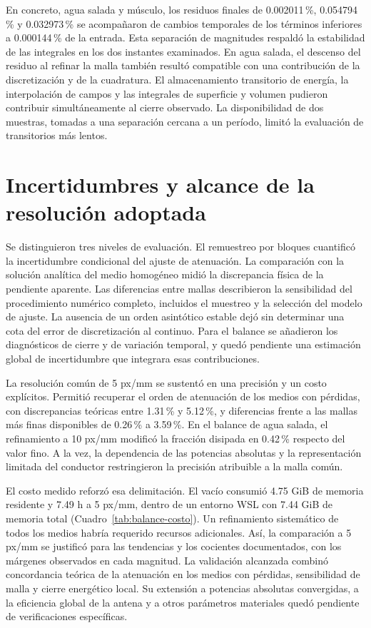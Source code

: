 En concreto, agua salada y músculo, los residuos finales de 0.002011\,\%, 0.054794\,\% y 0.032973\,\% se acompañaron de cambios temporales de los términos inferiores a 0.000144\,\% de la entrada. Esta separación de magnitudes respaldó la estabilidad de las integrales en los dos instantes examinados. En agua salada, el descenso del residuo al refinar la malla también resultó compatible con una contribución de la discretización y de la cuadratura. El almacenamiento transitorio de energía, la interpolación de campos y las integrales de superficie y volumen pudieron contribuir simultáneamente al cierre observado. La disponibilidad de dos muestras, tomadas a una separación cercana a un período, limitó la evaluación de transitorios más lentos.

\section{Incertidumbres y alcance de la resolución adoptada}
Se distinguieron tres niveles de evaluación. El remuestreo por bloques cuantificó la incertidumbre condicional del ajuste de atenuación. La comparación con la solución analítica del medio homogéneo midió la discrepancia física de la pendiente aparente. Las diferencias entre mallas describieron la sensibilidad del procedimiento numérico completo, incluidos el muestreo y la selección del modelo de ajuste. La ausencia de un orden asintótico estable dejó sin determinar una cota del error de discretización al continuo. Para el balance se añadieron los diagnósticos de cierre y de variación temporal, y quedó pendiente una estimación global de incertidumbre que integrara esas contribuciones.

La resolución común de 5 px/mm se sustentó en una precisión y un costo explícitos. Permitió recuperar el orden de atenuación de los medios con pérdidas, con discrepancias teóricas entre 1.31\,\% y 5.12\,\%, y diferencias frente a las mallas más finas disponibles de 0.26\,\% a 3.59\,\%. En el balance de agua salada, el refinamiento a 10 px/mm modificó la fracción disipada en 0.42\,\% respecto del valor fino. A la vez, la dependencia de las potencias absolutas y la representación limitada del conductor restringieron la precisión atribuible a la malla común.

El costo medido reforzó esa delimitación. El vacío consumió 4.75 GiB de memoria residente y 7.49 h a 5 px/mm, dentro de un entorno WSL con 7.44 GiB de memoria total (Cuadro~\ref{tab:balance-costo}). Un refinamiento sistemático de todos los medios habría requerido recursos adicionales. Así, la comparación a 5 px/mm se justificó para las tendencias y los cocientes documentados, con los márgenes observados en cada magnitud. La validación alcanzada combinó concordancia teórica de la atenuación en los medios con pérdidas, sensibilidad de malla y cierre energético local. Su extensión a potencias absolutas convergidas, a la eficiencia global de la antena y a otros parámetros materiales quedó pendiente de verificaciones específicas.

